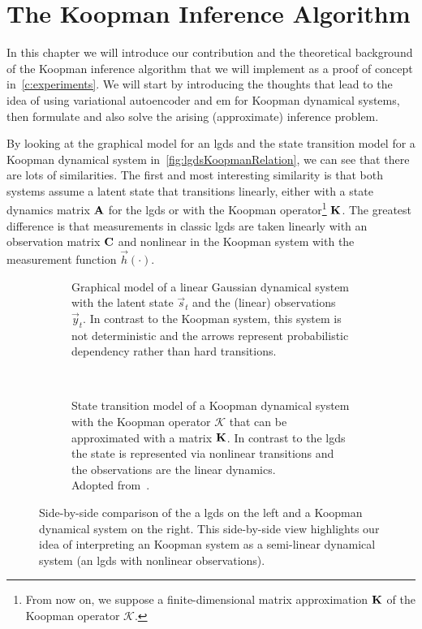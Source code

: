 \chapter{The Koopman Inference Algorithm}
\label{c:nonlinearGaussianKoopman}



In this chapter we will introduce our contribution and the theoretical background of the Koopman inference algorithm that we will implement as a proof of concept in~\autoref{c:experiments}. We will start by introducing the thoughts that lead to the idea of using variational autoencoder and \ac{em} for Koopman dynamical systems, then formulate and also solve the arising (approximate) inference problem.

By looking at the graphical model for an \ac{lgds} and the state transition model for a Koopman dynamical system in~\autoref{fig:lgdsKoopmanRelation}, we can see that there are lots of similarities. The first and most interesting similarity is that both systems assume a latent state that transitions linearly, either with a state dynamics matrix \(\boldsymbol{\mathrm{A}}\) for the \ac{lgds} or with the Koopman operator\footnote{From now on, we suppose a finite-dimensional matrix approximation \(\boldsymbol{\mathrm{K}}\) of the Koopman operator \(\mathcal{K}\).} \(\boldsymbol{\mathrm{K}}\). The greatest difference is that measurements in classic \ac{lgds} are taken linearly with an observation matrix \( \boldsymbol{\mathrm{C}} \) and nonlinear in the Koopman system with the measurement function \( \vec{h}(\cdot) \).

\begin{figure}
	\centering
	\begin{subfigure}[t]{0.5\linewidth}
		\centering
		\resizebox{\linewidth}{!}{\tikzLinearGaussianDynamicalSystem}
		\caption{Graphical model of a linear Gaussian dynamical system with the latent state \(\vec{s}_t\) and the (linear) observations \(\vec{y}_t\). In contrast to the Koopman system, this system is not deterministic and the arrows represent probabilistic dependency rather than hard transitions.}
	\end{subfigure}%
	~
	\begin{subfigure}[t]{0.5\linewidth}
		\centering
		\resizebox{\linewidth}{!}{\tikzKoopmanOperator}
		\caption{State transition model of a Koopman dynamical system with the Koopman operator \( \mathcal{K} \) that can be approximated with a matrix \(\boldsymbol{\mathrm{K}}\). In contrast to the \ac{lgds} the state is represented via nonlinear transitions and the observations are the linear dynamics. \\ Adopted from~\cite{bruntonKoopmanInvariantSubspaces2016}.}
	\end{subfigure}
	\caption{Side-by-side comparison of the a \ac{lgds} on the left and a Koopman dynamical system on the right. This side-by-side view highlights our idea of interpreting an Koopman system as a semi-linear dynamical system (\ie an \ac{lgds} with nonlinear observations).}
	\label{fig:lgdsKoopmanRelation}
\end{figure}

